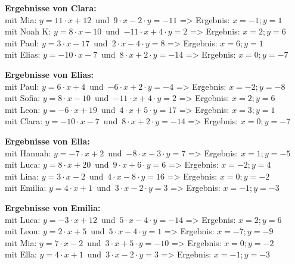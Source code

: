 \begin{minipage}{\textwidth}
\textbf{Ergebnisse von Clara:}\\
mit Mia: $y=11\cdot x+12$\mbox{ }und\mbox{ }$9\cdot x-2\cdot y=-11$ => Ergebnis: $x=-1;y=1$
\\
mit Noah K: $y=8\cdot x-10$\mbox{ }und\mbox{ }$-11\cdot x+4\cdot y=2$ => Ergebnis: $x=2;y=6$
\\
mit Paul: $y=3\cdot x-17$\mbox{ }und\mbox{ }$2\cdot x-4\cdot y=8$ => Ergebnis: $x=6;y=1$
\\
mit Elias: $y=-10\cdot x-7$\mbox{ }und\mbox{ }$8\cdot x+2\cdot y=-14$ => Ergebnis: $x=0;y=-7$
\\
\end{minipage}
\vspace*{3ex}

\begin{minipage}{\textwidth}
\textbf{Ergebnisse von Elias:}\\
mit Paul: $y=6\cdot x+4$\mbox{ }und\mbox{ }$-6\cdot x+2\cdot y=-4$ => Ergebnis: $x=-2;y=-8$
\\
mit Sofia: $y=8\cdot x-10$\mbox{ }und\mbox{ }$-11\cdot x+4\cdot y=2$ => Ergebnis: $x=2;y=6$
\\
mit Leon: $y=-6\cdot x+19$\mbox{ }und\mbox{ }$4\cdot x+5\cdot y=17$ => Ergebnis: $x=3;y=1$
\\
mit Clara: $y=-10\cdot x-7$\mbox{ }und\mbox{ }$8\cdot x+2\cdot y=-14$ => Ergebnis: $x=0;y=-7$
\\
\end{minipage}
\vspace*{3ex}

\begin{minipage}{\textwidth}
\textbf{Ergebnisse von Ella:}\\
mit Hannah: $y=-7\cdot x+2$\mbox{ }und\mbox{ }$-8\cdot x-3\cdot y=7$ => Ergebnis: $x=1;y=-5$
\\
mit Luca: $y=8\cdot x+20$\mbox{ }und\mbox{ }$9\cdot x+6\cdot y=6$ => Ergebnis: $x=-2;y=4$
\\
mit Lina: $y=3\cdot x-2$\mbox{ }und\mbox{ }$4\cdot x-8\cdot y=16$ => Ergebnis: $x=0;y=-2$
\\
mit Emilia: $y=4\cdot x+1$\mbox{ }und\mbox{ }$3\cdot x-2\cdot y=3$ => Ergebnis: $x=-1;y=-3$
\\
\end{minipage}
\vspace*{3ex}

\begin{minipage}{\textwidth}
\textbf{Ergebnisse von Emilia:}\\
mit Luca: $y=-3\cdot x+12$\mbox{ }und\mbox{ }$5\cdot x-4\cdot y=-14$ => Ergebnis: $x=2;y=6$
\\
mit Leon: $y=2\cdot x+5$\mbox{ }und\mbox{ }$5\cdot x-4\cdot y=1$ => Ergebnis: $x=-7;y=-9$
\\
mit Mia: $y=7\cdot x-2$\mbox{ }und\mbox{ }$3\cdot x+5\cdot y=-10$ => Ergebnis: $x=0;y=-2$
\\
mit Ella: $y=4\cdot x+1$\mbox{ }und\mbox{ }$3\cdot x-2\cdot y=3$ => Ergebnis: $x=-1;y=-3$
\\
\end{minipage}
\vspace*{3ex}

